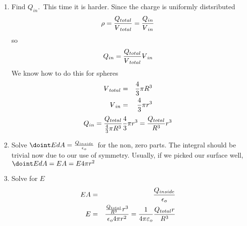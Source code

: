 \documentclass{article}
\begin{document}
\begin{enumerate}
\item {\small Find }$Q_{in}.${\small \ This time it is harder. Since the
charge is uniformly distsributed }%
\[
\rho =\frac{Q_{total}}{%
\ooalign{\hfil$V$\hfil\cr\kern0.1em--\hfil\cr}%
_{total}}=\frac{Q_{in}}{%
\ooalign{\hfil$V$\hfil\cr\kern0.1em--\hfil\cr}%
_{in}}
\]%
{\small so }%
\[
Q_{in}=\frac{Q_{total}}{%
\ooalign{\hfil$V$\hfil\cr\kern0.1em--\hfil\cr}%
_{total}}%
\ooalign{\hfil$V$\hfil\cr\kern0.1em--\hfil\cr}%
_{in}
\]%
{\small We know how to do this for spheres }%
\begin{eqnarray*}
\ooalign{\hfil$V$\hfil\cr\kern0.1em--\hfil\cr}%
_{total} &=&\frac{4}{3}\pi R^{3} \\
\ooalign{\hfil$V$\hfil\cr\kern0.1em--\hfil\cr}%
_{in} &=&\frac{4}{3}\pi r^{3}
\end{eqnarray*}%
\[
Q_{in}=\frac{Q_{total}}{\frac{4}{3}\pi R^{3}}\frac{4}{3}\pi r^{3}=\frac{%
Q_{total}}{R^{3}}r^{3}
\]

\item {\small Solve }$\doint EdA=\frac{Q_{inside}}{\epsilon _{o}}${\small \
for the non, zero parts. The integral should be trivial now due to our use
of symmetry. Usually, if we picked our surface well, }$\doint EdA=EA=E4\pi
r^{2}$

\item {\small Solve for }$E$%
\begin{eqnarray*}
EA &=&\frac{Q_{inside}}{\epsilon _{o}} \\
E &=&\frac{\frac{Q_{total}}{R^{3}}r^{3}}{\epsilon _{o}4\pi r^{2}}=\frac{1}{%
4\pi \varepsilon _{o}}\frac{Q_{total}r}{R^{3}}
\end{eqnarray*}
\end{enumerate}
\end{document}
